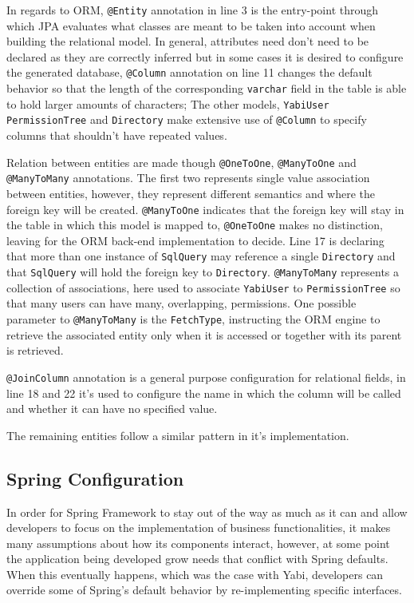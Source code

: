 In regards to \gls{ORM}, \texttt{@Entity} annotation in line 3 is the entry-point through which \gls{JPA} evaluates what classes are meant to be taken into account when building the relational model.
In general, attributes need don't need to be declared as they are correctly inferred but in some cases it is desired to configure the generated database, \texttt{@Column} annotation on line 11 changes the default behavior so that the length of the corresponding \texttt{varchar} field in the table is able to hold larger amounts of characters; The other models, \texttt{YabiUser} \texttt{PermissionTree} and \texttt{Directory} make extensive use of \texttt{@Column} to specify columns that shouldn't have repeated values.

Relation between entities are made though \texttt{@OneToOne}, \texttt{@ManyToOne} and \texttt{@ManyToMany} annotations.
The first two represents single value association between entities, however, they represent different semantics and where the foreign key will be created.
\texttt{@ManyToOne} indicates that the foreign key will stay in the table in which this model is mapped to, \texttt{@OneToOne} makes no distinction, leaving for the \gls{ORM} back-end implementation to decide.
Line 17 is declaring that more than one instance of \texttt{SqlQuery} may reference a single \texttt{Directory} and that \texttt{SqlQuery} will hold the foreign key to \texttt{Directory}.
\texttt{@ManyToMany} represents a collection of associations, here used to associate \texttt{YabiUser} to \texttt{PermissionTree} so that many users can have many, overlapping, permissions. One possible parameter to \texttt{@ManyToMany} is the \texttt{FetchType}, instructing the \gls{ORM} engine to retrieve the associated entity only when it is accessed or together with its parent is retrieved.

\texttt{@JoinColumn} annotation is a general purpose configuration for relational fields, in line 18 and 22 it's used to configure the name in which the column will be called and whether it can have no specified value.



The remaining entities follow a similar pattern in it's implementation.

\subsection{Spring Configuration}\label{s:config}
In order for Spring Framework to stay out of the way as much as it can and allow developers to focus on the implementation of business functionalities, it makes many assumptions about how its components interact, however, at some point the application being developed grow needs that conflict with Spring defaults. When this eventually happens, which was the case with \gls{Yabi}, developers can override some of Spring's default behavior by re-implementing specific interfaces.

